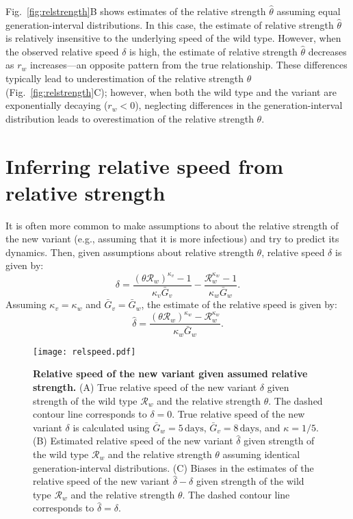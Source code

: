 \documentclass[12pt]{article}
\newcommand{\fref}[1]{Fig.~\ref{fig:#1}}
\newcommand{\RR}{\ensuremath{{\mathcal R}}\xspace}
\begin{document}
\fref{relstrength}B shows estimates of the relative strength $\hat{\theta}$ assuming equal generation-interval distributions.
In this case, the estimate of relative strength $\hat{\theta}$ is relatively insensitive to the underlying speed of the wild type.
However, when the observed relative speed $\delta$ is high, the estimate of relative strength $\hat{\theta}$ decreases as $r_w$ increases---an opposite pattern from the true relationship.
These differences typically lead to underestimation of the relative strength $\theta$ (\fref{relstrength}C);
however, when both the wild type and the variant are exponentially decaying ($r_w < 0$), neglecting differences in the generation-interval distribution leads to overestimation of the relative strength $\theta$.

\section{Inferring relative speed from relative strength}

It is often more common to make assumptions to about the relative strength of the new variant (e.g., assuming that it is more infectious) and try to predict its dynamics.
Then, given assumptions about relative strength $\theta$, relative speed $\delta$ is given by:
\begin{equation}
\delta = \frac{(\theta \RR_w)^{\kappa_v} - 1}{\kappa_v \bar{G}_v} - \frac{\RR_w^{\kappa_w} - 1}{\kappa_w \bar{G}_w}.
\end{equation}
Assuming $\kappa_v = \kappa_w$ and $\bar{G}_v = \bar{G}_w$, the estimate of the relative speed is given by:
\begin{equation}
\hat{\delta} = \frac{(\theta \RR_w)^{\kappa_w} - \RR_w^{\kappa_w}}{\kappa_w \bar{G}_w}.
\end{equation}


\begin{figure}[!th]
\texttt{[image: relspeed.pdf]}
\caption{
\textbf{Relative speed of the new variant given assumed relative strength.}
(A) True relative speed of the new variant $\delta$ given strength of the wild type $\RR_w$ and the relative strength $\theta$.
The dashed contour line corresponds to $\delta = 0$.
True relative speed of the new variant $\delta$ is calculated using $\bar{G}_w = 5\,\textrm{days}$, $\bar{G}_v = 8\,\textrm{days}$, and $\kappa = 1/5$. 
(B) Estimated relative speed of the new variant $\hat{\delta}$ given strength of the wild type $\RR_w$ and the relative strength $\theta$ assuming identical generation-interval distributions.
(C) Biases in the estimates of the relative speed of the new variant $\hat{\delta} - \delta$ given strength of the wild type $\RR_w$ and the relative strength $\theta$.
The dashed contour line corresponds to $\hat{\delta} = \delta$.
}
\label{fig:relspeed}
\end{figure}
\end{document}
